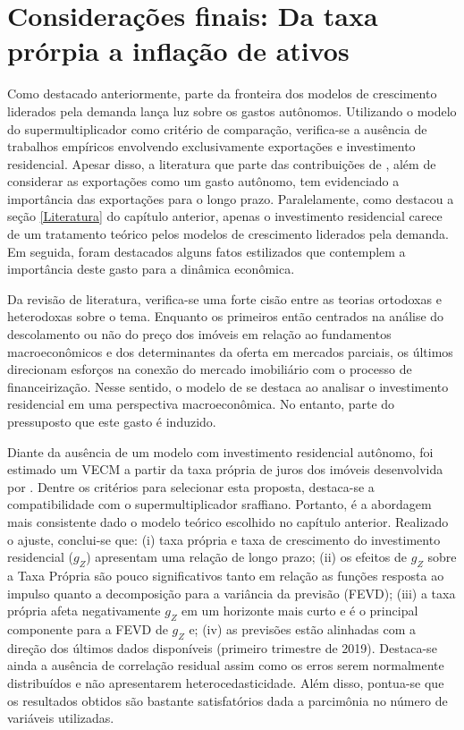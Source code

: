 \section{Considerações finais: Da taxa prórpia a inflação de ativos}
\label{Conclucao_Empirica}


Como destacado anteriormente, parte da fronteira dos modelos de crescimento liderados pela demanda lança luz sobre os gastos autônomos. Utilizando o modelo do supermultiplicador como critério de comparação, verifica-se a ausência de trabalhos empíricos envolvendo exclusivamente exportações e investimento residencial. Apesar disso, a literatura que parte das contribuições de \textcite{mccombie_balance--payments_1994}, além de considerar as exportações como um gasto autônomo, tem evidenciado  a importância das exportações para o longo prazo. Paralelamente, como destacou a seção \ref{Literatura} do capítulo anterior, apenas o investimento residencial carece de um tratamento teórico pelos modelos de crescimento liderados pela demanda. Em seguida, foram destacados alguns fatos estilizados que contemplem a importância deste gasto para a dinâmica econômica.

Da revisão de literatura, verifica-se uma forte cisão entre as teorias ortodoxas e heterodoxas sobre o tema. Enquanto os primeiros então centrados na análise do descolamento ou não do preço dos imóveis em relação ao fundamentos macroeconômicos e dos determinantes da oferta em mercados parciais, os últimos direcionam esforços na conexão do mercado imobiliário com o processo de financeirização. Nesse sentido, o modelo de \textcite{arestis_residential_2015} se destaca ao analisar o investimento residencial em uma perspectiva macroeconômica. No entanto, parte do pressuposto que este gasto é induzido.

Diante da ausência de um modelo com investimento residencial autônomo, foi estimado um VECM a partir da taxa própria de juros dos imóveis desenvolvida por \textcite{teixeira_crescimento_2015}. Dentre os critérios para selecionar esta proposta, destaca-se a compatibilidade com o supermultiplicador sraffiano. Portanto, é a abordagem mais consistente dado o modelo teórico escolhido no capítulo anterior. Realizado o ajuste, conclui-se que: 
(i) taxa própria e taxa de crescimento do investimento residencial ($g_Z$) apresentam uma relação de longo prazo; 
(ii) os efeitos de $g_Z$ sobre a Taxa Própria são pouco significativos tanto em relação as funções resposta ao impulso quanto a decomposição para a variância da previsão (FEVD);
(iii) a taxa própria afeta negativamente $g_Z$ em um horizonte mais curto e é o principal componente para a FEVD de $g_Z$ e; (iv) as previsões estão alinhadas com a direção dos últimos dados disponíveis (primeiro trimestre de 2019). Destaca-se ainda a ausência de correlação residual assim como os erros serem normalmente distribuídos e não apresentarem heterocedasticidade. Além disso, pontua-se que os resultados obtidos são bastante satisfatórios dada a parcimônia no número de variáveis utilizadas.

